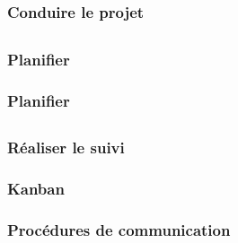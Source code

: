 \speaker{\Sergi{}}
\subsection{} %

\begin{frame}
\frametitle{Conduire le projet}

\end{frame}

\subsection{}

\begin{frame}
\frametitle{Planifier}

\end{frame}


\begin{frame}
\frametitle{Planifier}

\end{frame}

\subsection{}

\begin{frame}
\frametitle{Réaliser le suivi}

\end{frame}


\begin{frame}
\frametitle{Kanban}

\end{frame}


\begin{frame}
\frametitle{Procédures de communication}

\end{frame}
